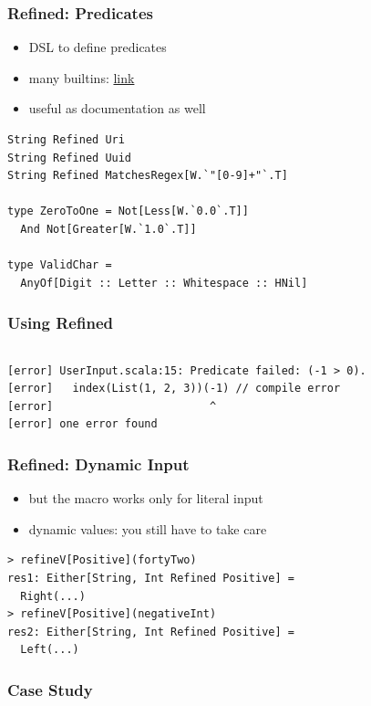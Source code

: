 \documentclass{beamer}
\begin{document}
\begin{frame}[fragile]
  \frametitle{Refined: Predicates}
  \begin{itemize}
  \item DSL to define predicates
  \item many builtins:
    \textcolor{beamer@ccblue}{\href{https://github.com/fthomas/refined\#provided-predicates}{link}}
  \item useful as documentation as well
  \end{itemize}

\begin{verbatim}
String Refined Uri
String Refined Uuid
String Refined MatchesRegex[W.`"[0-9]+"`.T]

type ZeroToOne = Not[Less[W.`0.0`.T]] 
  And Not[Greater[W.`1.0`.T]]

type ValidChar = 
  AnyOf[Digit :: Letter :: Whitespace :: HNil]
\end{verbatim}
  
\end{frame}

\begin{frame}
  \frametitle{Using Refined}
  \inputminted[firstline=8,
  fontsize=\small]{scala}{../src/main/scala/de/codecentric/refined/UserInput.scala}
\begin{verbatim}
[error] UserInput.scala:15: Predicate failed: (-1 > 0).
[error]   index(List(1, 2, 3))(-1) // compile error
[error]                        ^
[error] one error found
\end{verbatim}
\end{frame}

\begin{frame}[fragile]
  \frametitle{Refined: Dynamic Input}
  \begin{itemize}
  \item but the macro works only for literal input
  \item dynamic values: you still have to take care
  \end{itemize}
  
\begin{verbatim}
> refineV[Positive](fortyTwo)
res1: Either[String, Int Refined Positive] = 
  Right(...)
> refineV[Positive](negativeInt)
res2: Either[String, Int Refined Positive] = 
  Left(...)
\end{verbatim}
\end{frame}

\begin{frame}
  \frametitle{Case Study}
  \inputminted[fontsize=\small,firstline=8, lastline=22]{scala}{../src/main/scala/de/codecentric/three/VendingMachine.scala}
\end{frame}
\end{document}
